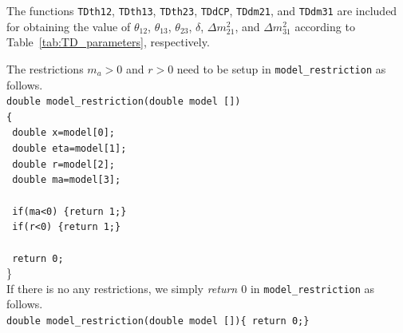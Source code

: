 \documentclass[a4paper,11pt]{article}
\begin{document}
The functions \texttt{TDth12}, \texttt{TDth13}, \texttt{TDth23}, \texttt{TDdCP}, \texttt{TDdm21}, and \texttt{TDdm31} are included for obtaining the value of $\theta_{12}$, $\theta_{13}$, $\theta_{23}$, $\delta$, $\Delta m_{21}^2$, and $\Delta m_{31}^2$ according to Table~\ref{tab:TD_parameters}, respectively. 

The restrictions $m_a>0$ and $r>0$ need to be setup in \texttt{model\_restriction} as follows.\vspace{0.2cm}\\
\texttt{double model\_restriction(double model [])}\\
\texttt{\{}\\
\texttt{    double x=model[0];}\\
\texttt{    double eta=model[1];}\\
\texttt{    double r=model[2];}\\
\texttt{    double ma=model[3];}\\
    \\
\texttt{    if(ma<0) \{return 1;\}}\\
\texttt{    if(r<0) \{return 1;\}}\\
\\ 
\texttt{    return 0;}\\
\}\vspace{0.2cm}\\
If there is no any restrictions, we simply \textit{return $0$} in \texttt{model\_restriction} as follows.\vspace{0.2cm}\\
\texttt{double model\_restriction(double model [])\{ return 0;\} }\vspace{0.2cm}\\
\end{document}
